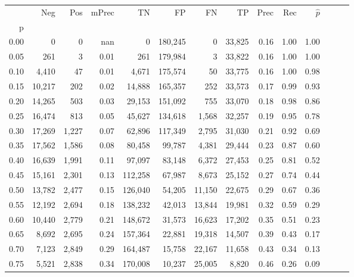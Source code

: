 \begin{tabular}{rrrrrrrrrrrrrr}
\toprule
{} &     Neg &    Pos & mPrec &       TN &       FP &      FN &      TP &  Prec &   Rec & $\hat{p}$ \\
p    &         &        &       &          &          &         &         &       &       &           \\
\midrule
0.00 &       0 &      0 &   nan &        0 &  180,245 &       0 &  33,825 &  0.16 &  1.00 &      1.00 \\
0.05 &     261 &      3 &  0.01 &      261 &  179,984 &       3 &  33,822 &  0.16 &  1.00 &      1.00 \\
0.10 &   4,410 &     47 &  0.01 &    4,671 &  175,574 &      50 &  33,775 &  0.16 &  1.00 &      0.98 \\
0.15 &  10,217 &    202 &  0.02 &   14,888 &  165,357 &     252 &  33,573 &  0.17 &  0.99 &      0.93 \\
0.20 &  14,265 &    503 &  0.03 &   29,153 &  151,092 &     755 &  33,070 &  0.18 &  0.98 &      0.86 \\
0.25 &  16,474 &    813 &  0.05 &   45,627 &  134,618 &   1,568 &  32,257 &  0.19 &  0.95 &      0.78 \\
0.30 &  17,269 &  1,227 &  0.07 &   62,896 &  117,349 &   2,795 &  31,030 &  0.21 &  0.92 &      0.69 \\
0.35 &  17,562 &  1,586 &  0.08 &   80,458 &   99,787 &   4,381 &  29,444 &  0.23 &  0.87 &      0.60 \\
0.40 &  16,639 &  1,991 &  0.11 &   97,097 &   83,148 &   6,372 &  27,453 &  0.25 &  0.81 &      0.52 \\
0.45 &  15,161 &  2,301 &  0.13 &  112,258 &   67,987 &   8,673 &  25,152 &  0.27 &  0.74 &      0.44 \\
0.50 &  13,782 &  2,477 &  0.15 &  126,040 &   54,205 &  11,150 &  22,675 &  0.29 &  0.67 &      0.36 \\
0.55 &  12,192 &  2,694 &  0.18 &  138,232 &   42,013 &  13,844 &  19,981 &  0.32 &  0.59 &      0.29 \\
0.60 &  10,440 &  2,779 &  0.21 &  148,672 &   31,573 &  16,623 &  17,202 &  0.35 &  0.51 &      0.23 \\
0.65 &   8,692 &  2,695 &  0.24 &  157,364 &   22,881 &  19,318 &  14,507 &  0.39 &  0.43 &      0.17 \\
0.70 &   7,123 &  2,849 &  0.29 &  164,487 &   15,758 &  22,167 &  11,658 &  0.43 &  0.34 &      0.13 \\
0.75 &   5,521 &  2,838 &  0.34 &  170,008 &   10,237 &  25,005 &   8,820 &  0.46 &  0.26 &      0.09 \\

\end{tabular}
